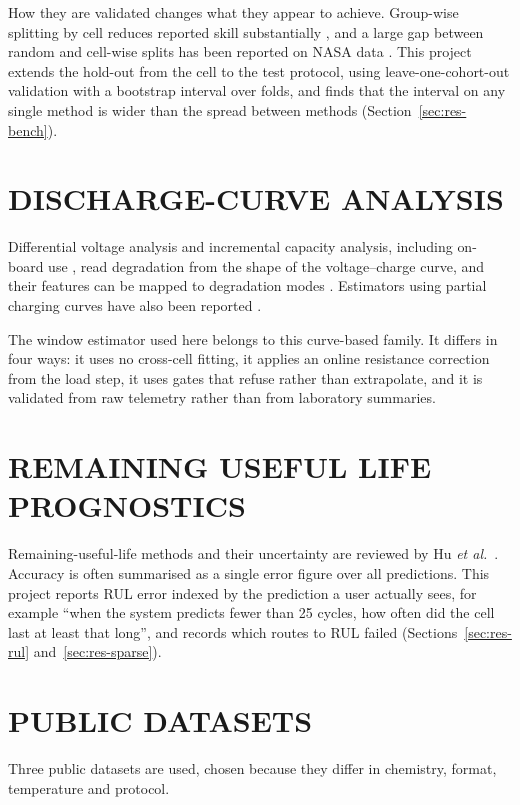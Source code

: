 How they are validated changes what they appear to achieve. Group-wise splitting by cell reduces reported skill substantially \cite{maher2025}, and a large gap between random and cell-wise splits has been reported on NASA data \cite{le2026}. This project extends the hold-out from the cell to the test protocol, using leave-one-cohort-out validation with a bootstrap interval over folds, and finds that the interval on any single method is wider than the spread between methods (Section~\ref{sec:res-bench}).

\section{DISCHARGE-CURVE ANALYSIS}

Differential voltage analysis \cite{bloom2005} and incremental capacity analysis, including on-board use \cite{weng2013}, read degradation from the shape of the voltage--charge curve, and their features can be mapped to degradation modes \cite{dubarry2012,birkl2017}. Estimators using partial charging curves have also been reported \cite{tian2021}.

The window estimator used here belongs to this curve-based family. It differs in four ways: it uses no cross-cell fitting, it applies an online resistance correction from the load step, it uses gates that refuse rather than extrapolate, and it is validated from raw telemetry rather than from laboratory summaries.

\section{REMAINING USEFUL LIFE PROGNOSTICS}

Remaining-useful-life methods and their uncertainty are reviewed by Hu \emph{et al.}\ \cite{hu2020}. Accuracy is often summarised as a single error figure over all predictions. This project reports RUL error indexed by the prediction a user actually sees, for example ``when the system predicts fewer than 25 cycles, how often did the cell last at least that long'', and records which routes to RUL failed (Sections~\ref{sec:res-rul} and~\ref{sec:res-sparse}).

\section{PUBLIC DATASETS}

Three public datasets are used, chosen because they differ in chemistry, format, temperature and protocol.

